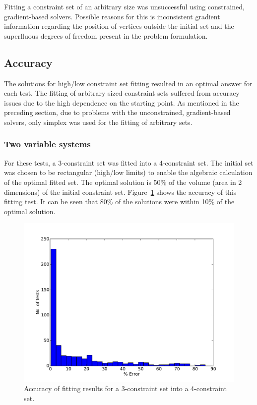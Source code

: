 Fitting a constraint set of an arbitrary size was unsuccessful using constrained, gradient-based solvers.
Possible reasons for this is inconsistent gradient information regarding the position of vertices outside the initial set and the superfluous degrees of freedom present in the problem formulation.

\subsection{Accuracy}\label{sec:fittingaccuracy}
The solutions for high/low constraint set fitting resulted in an optimal answer for each test.
The fitting of arbitrary sized constraint sets suffered from accuracy issues due to the high dependence on the starting point.
As mentioned in the preceding section, due to problems with the unconstrained, gradient-based solvers, only simplex was used for the fitting of arbitrary sets.

\subsubsection{Two variable systems}\label{sec:2dfitting}
For these tests, a 3-constraint set was fitted into a 4-constraint set.
The initial set was chosen to be rectangular (high/low limits) to enable the algebraic calculation of the optimal fitted set.
The optimal solution is 50\% of the volume (area in 2 dimensions) of the initial constraint set.
Figure~\ref{fig:arbfitaccuracy2d} shows the accuracy of this fitting test.
It can be seen that 80\% of the solutions were within 10\% of the optimal solution.
\begin{figure}[htbp]
  \centering
    \includegraphics[width=\fullwidth]{graph/arbfitaccuracy2d.pdf}
  \caption[Accuracy of constraint set fitting for 2 variables]{Accuracy of fitting results for a 3-constraint set into a 4-constraint set.}
  \label{fig:arbfitaccuracy2d}
\end{figure}

